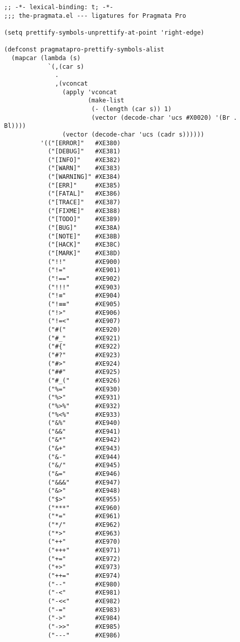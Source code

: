 \documentclass[11pt]{article}
\begin{document}
\begin{verbatim}
;; -*- lexical-binding: t; -*-
;;; the-pragmata.el --- ligatures for Pragmata Pro

(setq prettify-symbols-unprettify-at-point 'right-edge)

(defconst pragmatapro-prettify-symbols-alist
  (mapcar (lambda (s)
            `(,(car s)
              .
              ,(vconcat
                (apply 'vconcat
                       (make-list
                        (- (length (car s)) 1)
                        (vector (decode-char 'ucs #X0020) '(Br . Bl))))
                (vector (decode-char 'ucs (cadr s))))))
          '(("[ERROR]"   #XE380)
            ("[DEBUG]"   #XE381)
            ("[INFO]"    #XE382)
            ("[WARN]"    #XE383)
            ("[WARNING]" #XE384)
            ("[ERR]"     #XE385)
            ("[FATAL]"   #XE386)
            ("[TRACE]"   #XE387)
            ("[FIXME]"   #XE388)
            ("[TODO]"    #XE389)
            ("[BUG]"     #XE38A)
            ("[NOTE]"    #XE38B)
            ("[HACK]"    #XE38C)
            ("[MARK]"    #XE38D)
            ("!!"        #XE900)
            ("!="        #XE901)
            ("!=="       #XE902)
            ("!!!"       #XE903)
            ("!≡"        #XE904)
            ("!≡≡"       #XE905)
            ("!>"        #XE906)
            ("!=<"       #XE907)
            ("#("        #XE920)
            ("#_"        #XE921)
            ("#{"        #XE922)
            ("#?"        #XE923)
            ("#>"        #XE924)
            ("##"        #XE925)
            ("#_("       #XE926)
            ("%="        #XE930)
            ("%>"        #XE931)
            ("%>%"       #XE932)
            ("%<%"       #XE933)
            ("&%"        #XE940)
            ("&&"        #XE941)
            ("&*"        #XE942)
            ("&+"        #XE943)
            ("&-"        #XE944)
            ("&/"        #XE945)
            ("&="        #XE946)
            ("&&&"       #XE947)
            ("&>"        #XE948)
            ("$>"        #XE955)
            ("***"       #XE960)
            ("*="        #XE961)
            ("*/"        #XE962)
            ("*>"        #XE963)
            ("++"        #XE970)
            ("+++"       #XE971)
            ("+="        #XE972)
            ("+>"        #XE973)
            ("++="       #XE974)
            ("--"        #XE980)
            ("-<"        #XE981)
            ("-<<"       #XE982)
            ("-="        #XE983)
            ("->"        #XE984)
            ("->>"       #XE985)
            ("---"       #XE986)

\end{verbatim}
\end{document}
